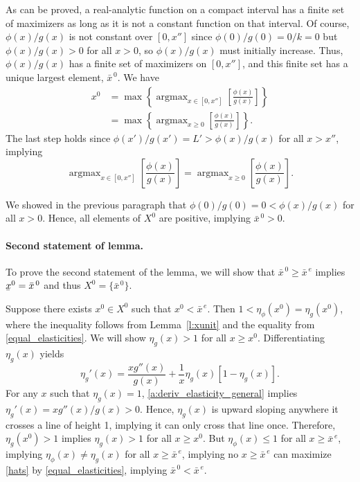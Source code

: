 \documentclass[12pt]{article}
\DeclareMathOperator*{\argmax}{argmax}
\newcommand{\lowerbar}[1]{\underaccent{\bar}{#1}}
\newcommand{\efficacy}{\phi}
\newcommand{\general}{g}
\newcommand{\xunitbar}{\bar{x}^{\,e}}
\newcommand{\xno}{x^{0}}
\newcommand{\Xno}{X^{0}}
\newcommand{\xnobar}{\bar{x}^{\,0}}
\newcommand{\xnolbar}{\lowerbar{x}^0}
\newcommand{\elasticity}[1]{\eta_{#1}}
\begin{document}
As can be proved, a real-analytic function on a compact interval has a
finite set of maximizers as long as it is not a constant function on
that interval. Of course, $\efficacy(x) / \general(x)$ is not constant
over $[0, x'']$ since $\efficacy(0) / \general(0) = 0 / k = 0$ but
$\efficacy(x) / \general(x) > 0$ for all $x > 0$, so $\efficacy(x) /
\general(x)$ must initially increase. Thus, $\efficacy(x) /
\general(x)$ has a finite set of maximizers on $[0, x'']$, and this
finite set has a unique largest element, $\xnobar$.
We have
\begin{align}
\xno & = \max \left\{ \argmax_{x \in [0, x'']} \left[ \frac{\efficacy(x)}{\general(x)} \right] \right\} \label{a:x01} \\
& = \max \left\{ \argmax_{x \geq 0} \left[ \frac{\efficacy(x)}{\general(x)} \right] \right\}. \label{a:x02}
\end{align}
The last step holds since $\efficacy(x') / \general(x') = L' > \efficacy(x) / \general(x)$ for all $x > x''$, implying 
\begin{equation}
\label{a:argmax}
\argmax_{x \in [0, x'']} \left[ \frac{\efficacy(x)}{\general(x)}
  \right] = \argmax_{x \geq 0} \left[ \frac{\efficacy(x)}{\general(x)}
  \right].
\end{equation}

We showed in the previous paragraph that $\efficacy(0) / \general(0) =
0 < \efficacy(x) / \general(x)$ for all $x > 0$. Hence, all elements
of $\Xno$ are positive, implying $\xnobar > 0$.

\paragraph{Second statement of lemma.}

To prove the second statement of the lemma, we will show that $\xnobar
\geq \xunitbar$ implies $\xnolbar = \xnobar$ and thus $\Xno = \{ \xnobar
\}$.
 
Suppose there exists $\xno \in \Xno$ such that $\xno <
\xunitbar$. Then $1 < \elasticity{\efficacy}\!(\xno) =
\elasticity{\general}\!(\xno)$, where the inequality follows from
Lemma~\ref{l:xunit} and the equality from
\eqref{equal_elasticities}. We will show $\elasticity{\general}\!(x) >
1$ for all $x \geq \xno$. Differentiating $\elasticity{\general}\!(x)$
yields
\begin{equation}
\label{a:deriv_elasticity_general}
\elasticity{\general}'\!(x) = \frac{x\general''(x)}{\general(x)} +
\frac{1}{x} \elasticity{\general}\!(x) [1 -
  \elasticity{\general}\!(x)].
\end{equation}
For any $x$ such that $\elasticity{\general}\!(x) = 1$,
\eqref{a:deriv_elasticity_general} implies
$\elasticity{\general}'\!(x) = x g''(x) / g(x) > 0$. Hence,
$\elasticity{\general}\!(x)$ is upward sloping anywhere it crosses a
line of height 1, implying it can only cross that line
once. Therefore, $\elasticity{\general}\!(\xno) > 1$ implies
$\elasticity{\general}\!(x) > 1$ for all $x \geq \xno$. But
$\elasticity{\efficacy}\!(x) \leq 1$ for all $x \geq \xunitbar$,
implying $\elasticity{\efficacy}\!(x) \neq \elasticity{\general}\!(x)$
for all $x \geq \xunitbar$, implying no $x \geq \xunitbar$ can
maximize \eqref{hats} by \eqref{equal_elasticities}, implying $\xnobar
< \xunitbar$.
 
\end{document}
